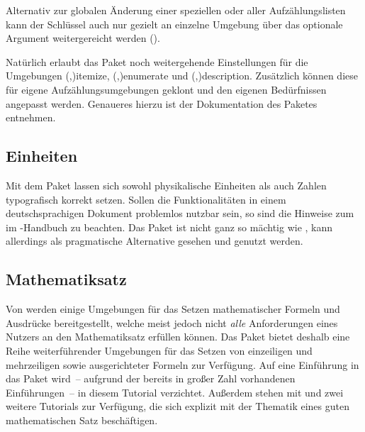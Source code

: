 \documentclass[%
  english,ngerman,%
  cdgeometry=no,DIV=12,%
  cd=false,cdfont=false,cdtitle=true,%
  headings=normal,%
  automark,%
  listof=toc,%
]{tudscrartcl}
\begin{document}
Alternativ zur globalen Änderung einer speziellen oder aller Aufzählungslisten 
kann der Schlüssel  auch nur gezielt an einzelne Umgebung 
über das optionale Argument weitergereicht werden 
().

Natürlich erlaubt das Paket noch weitergehende Einstellungen für die Umgebungen 
\Environment(,){itemize},
\Environment(,){enumerate} und
\Environment(,){description}. 
Zusätzlich können diese für eigene Aufzählungsumgebungen geklont und den 
eigenen Bedürfnissen angepasst werden. Genaueres hierzu ist der Dokumentation 
des Paketes  entnehmen.



\subsection{Einheiten}

Mit dem Paket  lassen sich sowohl physikalische Einheiten als 
auch Zahlen typografisch korrekt setzen. Sollen die Funktionalitäten in einem 
deutschsprachigen Dokument problemlos nutzbar sein, so sind die Hinweise zum 
 im 
\TUDScript-Handbuch zu beachten. Das Paket  ist nicht ganz so 
mächtig wie , kann allerdings als pragmatische Alternative 
gesehen und genutzt werden.



\subsection{Mathematiksatz}

Von  werden einige Umgebungen für das Setzen mathematischer 
Formeln und Ausdrücke bereitgestellt, welche meist jedoch nicht \emph{alle} 
Anforderungen eines Nutzers an den Mathematiksatz erfüllen können. Das Paket
 bietet deshalb eine Reihe weiterführender Umgebungen für das 
Setzen von einzeiligen und mehrzeiligen sowie ausgerichteter Formeln zur 
Verfügung. Auf eine Einführung in das Paket wird~-- aufgrund der bereits in 
großer Zahl vorhandenen Einführungen~-- in diesem Tutorial verzichtet. Außerdem 
stehen mit  und  zwei 
weitere Tutorials zur Verfügung, die sich explizit mit der Thematik eines guten 
mathematischen Satz beschäftigen.
\end{document}

